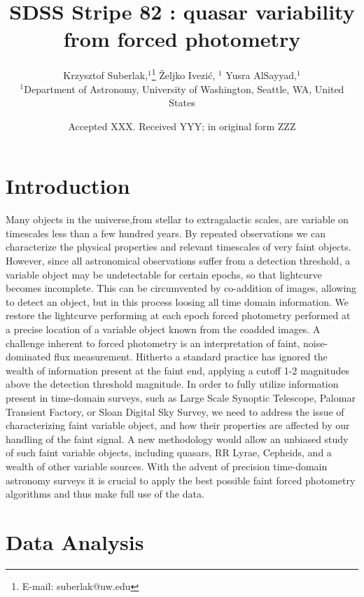 \documentclass[fleqn,usenatbib]{mnras}  %
\title[SDSS Quasars]{SDSS Stripe 82 : quasar variability from forced photometry}
\author[K. Suberlak et al.]{
Krzysztof Suberlak,$^{1}$\thanks{E-mail: suberlak@uw.edu}
\v{Z}eljko Ivezi\'c, $^{1}$
Yusra AlSayyad,$^{1}$ 
\\
$^{1}$Department of Astronomy, University of Washington, Seattle, WA, United States\\
}
\date{Accepted XXX. Received YYY; in original form ZZZ}
\begin{document}
\label{firstpage}
\pagerange{\pageref{firstpage}--\pageref{lastpage}}
\maketitle

\begin{abstract}

\end{abstract}




\section{Introduction}
\label{sec:intro}
Many objects in the universe,from stellar to extragalactic scales, are variable on timescales less than a few hundred years.  By repeated observations we can characterize the physical properties and relevant timescales of very faint objects. However, since all  astronomical observations suffer from a detection threshold, a variable object may be undetectable for certain epochs, so that lightcurve becomes incomplete. This can be circumvented by co-addition of images, allowing to detect an object, but in this process loosing all time domain information. We restore the lightcurve performing at each epoch forced photometry performed at a precise location of a variable object known from the coadded images. A challenge inherent to forced photometry is an interpretation of faint, noise-dominated flux measurement. Hitherto a standard practice has ignored the wealth of information present at the faint end, applying a cutoff 1-2 magnitudes above the detection threshold magnitude. In order to fully utilize information present in time-domain surveys, such as Large Scale Synoptic Telescope, Palomar Transient Factory, or Sloan Digital Sky Survey, we need to address the issue of characterizing faint variable object, and how their properties are affected by our handling of the faint signal. A new methodology would allow an unbiased  study of such faint variable objects, including quasars,  RR Lyrae,  Cepheids, and a wealth of other variable sources.  With the advent of precision  time-domain astronomy  surveys it is crucial to apply the best possible faint forced photometry algorithms and thus make full use of the  data.  

\section{Data Analysis}
\label{sec:data}
\end{document}
